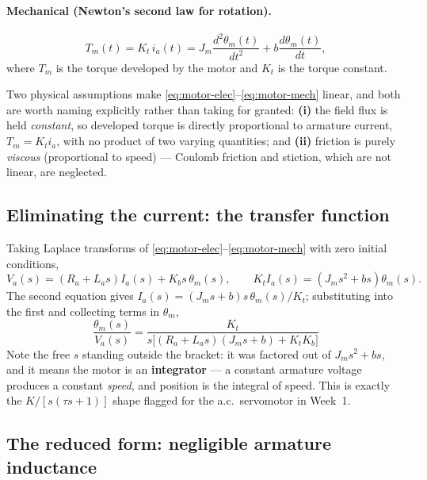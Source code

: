 \documentclass[11pt,a4paper]{article}
\begin{document}
\paragraph{Mechanical (Newton's second law for rotation).}
\begin{equation}
  T_m(t) = K_t\,i_a(t) = J_m\frac{d^2\theta_m(t)}{dt^2}+b\frac{d\theta_m(t)}{dt},
  \label{eq:motor-mech}
\end{equation}
where $T_m$ is the torque developed by the motor and $K_t$ is the torque
constant.

\begin{keyidea}[title=Why this model is linear]
Two physical assumptions make \eqref{eq:motor-elec}--\eqref{eq:motor-mech}
linear, and both are worth naming explicitly rather than taking for granted:
\textbf{(i)} the field flux is held \emph{constant}, so developed torque is
directly proportional to armature current, $T_m=K_ti_a$, with no product of
two varying quantities; and \textbf{(ii)} friction is purely \emph{viscous}
(proportional to speed) --- Coulomb friction and stiction, which are not
linear, are neglected.
\end{keyidea}

\subsection{Eliminating the current: the transfer function}

Taking Laplace transforms of \eqref{eq:motor-elec}--\eqref{eq:motor-mech} with
zero initial conditions,
\[
  V_a(s) = (R_a+L_as)I_a(s) + K_bs\,\theta_m(s), \qquad
  K_tI_a(s) = (J_ms^2+bs)\theta_m(s) .
\]
The second equation gives $I_a(s)=(J_ms+b)s\,\theta_m(s)/K_t$; substituting
into the first and collecting terms in $\theta_m$,
\begin{equation}
  \boxed{\;\frac{\theta_m(s)}{V_a(s)} =
   \frac{K_t}{s\big[(R_a+L_as)(J_ms+b)+K_tK_b\big]}\;}
  \label{eq:motor-full}
\end{equation}
Note the free $s$ standing outside the bracket: it was factored out of
$J_ms^2+bs$, and it means the motor is an \textbf{integrator} --- a constant
armature voltage produces a constant \emph{speed}, and position is the
integral of speed. This is exactly the $K/[s(\tau s+1)]$ shape flagged for the
a.c.\ servomotor in Week~1.

\subsection{The reduced form: negligible armature inductance}
\end{document}
